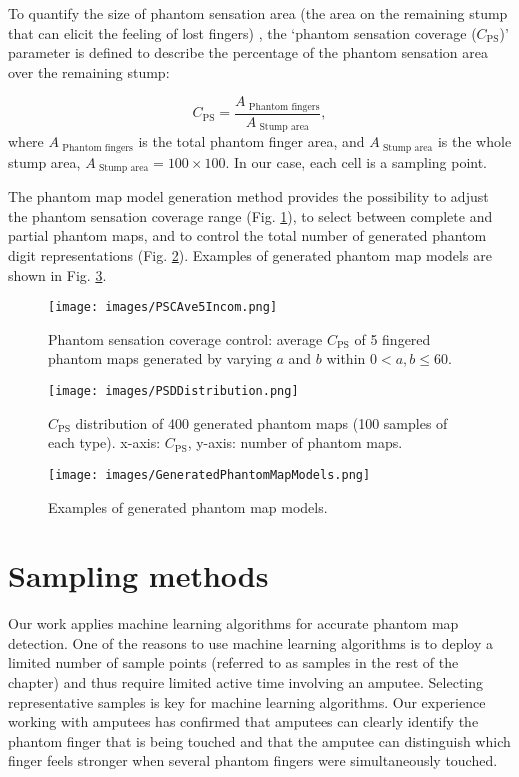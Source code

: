 To quantify the size of phantom sensation area (the area on the remaining stump that can elicit the feeling of lost fingers) , the `phantom sensation coverage ($C_{\text{PS}}$)'  parameter is defined to describe the percentage of the phantom sensation area over the remaining stump:

\begin{equation}
\label{eq:PSC}
C_{\text{PS}} = \frac{ A_{\text{ Phantom fingers}}}{A_{\text{ Stump  area}}}, 
\end{equation}
where $A_{\text{ Phantom fingers}}$ is the total phantom finger area, and $A_{\text{ Stump  area}}$ is the whole stump area,  $A_{\text{ Stump  area}} = 100 \times 100$. In our case, each cell is a sampling point.

The phantom map model generation method provides the possibility to adjust the phantom sensation coverage range (Fig. \ref{fig:PSCAve5Incom}), to select between complete and partial phantom maps, and to control the total number of generated phantom digit representations (Fig. \ref{Fig:PSDDistribution}). Examples of generated phantom map models are shown in Fig. \ref{fig:PhantomMapModel}.

\begin{figure}[htb]
    \centering
    \texttt{[image: images/PSCAve5Incom.png]}
    \caption{Phantom sensation coverage control: average $C_{\text{PS}}$ of 5 fingered phantom maps generated by varying $a$ and $b$ within $0<a,b \leq 60$.}
    \label{fig:PSCAve5Incom}
\end{figure} 

\begin{figure}[htb]
    \centering
    \texttt{[image: images/PSDDistribution.png]}
    \caption{$C_{\text{PS}}$ distribution of 400 generated phantom maps (100 samples of each type). x-axis: $C_{\text{PS}}$, y-axis: number of phantom maps. }
    \label{Fig:PSDDistribution}
\end{figure}

\begin{figure}[htb]
    \centering
    \texttt{[image: images/GeneratedPhantomMapModels.png]}
    \caption{ Examples of generated phantom map models.}
    \label{fig:PhantomMapModel}
\end{figure} 


\section{Sampling methods}
\label{chap2:sec:sampling_methods}
Our work applies machine learning algorithms for accurate phantom map detection. One of the reasons to use machine learning algorithms is to deploy a limited number of sample points (referred to as samples in the rest of the chapter) and thus require limited active time involving an amputee. 
Selecting representative samples is key for machine learning algorithms. Our experience working with amputees has confirmed that amputees can clearly identify the phantom finger that is being touched and that the amputee can distinguish which finger feels stronger when several phantom fingers were simultaneously touched. 

